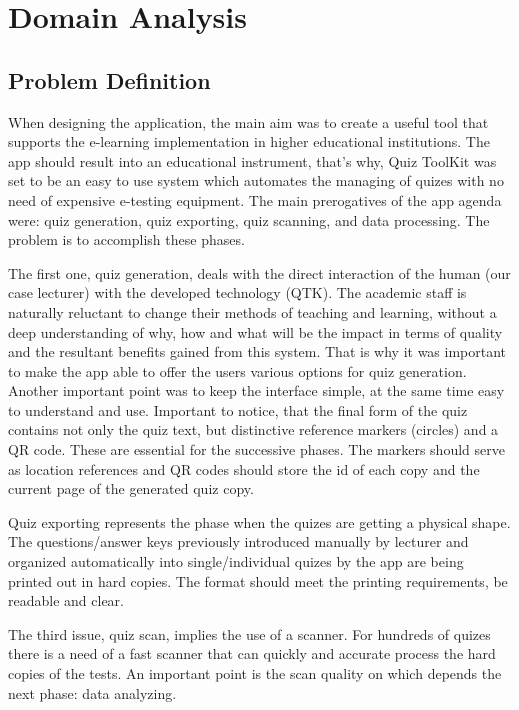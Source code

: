 \section{Domain Analysis}

\subsection{Problem Definition}

When designing the application, the main aim was to create a useful tool that supports the
e-learning implementation in higher educational institutions. The app should result into 
an educational instrument, that’s why, Quiz ToolKit was set to be an easy to use system 
which automates the managing of quizes with no need of expensive e-testing equipment. 
The main prerogatives of the app agenda were: quiz generation, quiz exporting, quiz scanning, 
and data processing. The problem is to accomplish these phases. 

The first one, quiz generation, deals with the direct interaction of the human (our case 
lecturer) with the developed technology (QTK). The academic staff is naturally reluctant to change their 
methods of teaching and learning, without a deep understanding of why, how and what 
will be the impact in terms of quality and the resultant benefits gained from this system. That is why it was 
important to make the app able to offer the users various options for quiz 
generation. Another important point was to keep the interface simple, at the same time 
easy to understand and use. Important to notice, that the final form of the quiz contains 
not only the quiz text, but distinctive reference markers (circles) and a QR code. These are 
essential for the successive phases. The markers should serve as location references and 
QR codes should store the id of each copy and the current page of the generated quiz copy.

Quiz exporting represents the phase when the quizes are getting a physical shape. The 
questions/answer keys previously introduced manually by lecturer and organized 
automatically into single/individual quizes by the app are being printed out in hard 
copies. The format should meet the printing requirements, be readable and clear. 

The third issue, quiz scan, implies the use of a scanner. For hundreds of quizes there is a 
need of a fast scanner that can quickly and accurate process the hard copies of the tests. 
An important point is the scan quality on which depends the next phase: data analyzing. 

